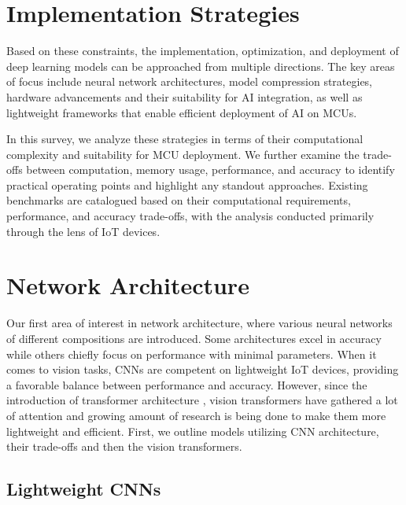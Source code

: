 \documentclass[conference]{IEEEtran}
\begin{document}
	\section{Implementation Strategies}
	Based on these constraints, the implementation, optimization, and deployment of deep learning models can be approached from multiple directions. The key areas of focus include neural network architectures, model compression strategies, hardware advancements and their suitability for AI integration, as well as lightweight frameworks that enable efficient deployment of AI on MCUs.
	
	In this survey, we analyze these strategies in terms of their computational complexity and suitability for MCU deployment. We further examine the trade-offs between computation, memory usage, performance, and accuracy to identify practical operating points and highlight any standout approaches. Existing benchmarks are catalogued based on their computational requirements, performance, and accuracy trade-offs, with the analysis conducted primarily through the lens of IoT devices.

	\section{Network Architecture}
	Our first area of interest in network architecture, where various neural networks of different compositions are introduced. Some architectures excel in accuracy while others chiefly focus on performance with minimal parameters. When it comes to vision tasks, CNNs are competent on lightweight IoT devices, providing a favorable balance between performance and accuracy. However, since the introduction of transformer architecture \cite{vaswani2017}, vision transformers have gathered a lot of attention and growing amount of research is being done to make them more lightweight and efficient. First, we outline models utilizing CNN architecture, their trade-offs and then the vision transformers.
	
	\subsection{Lightweight CNNs}
	
\end{document}
